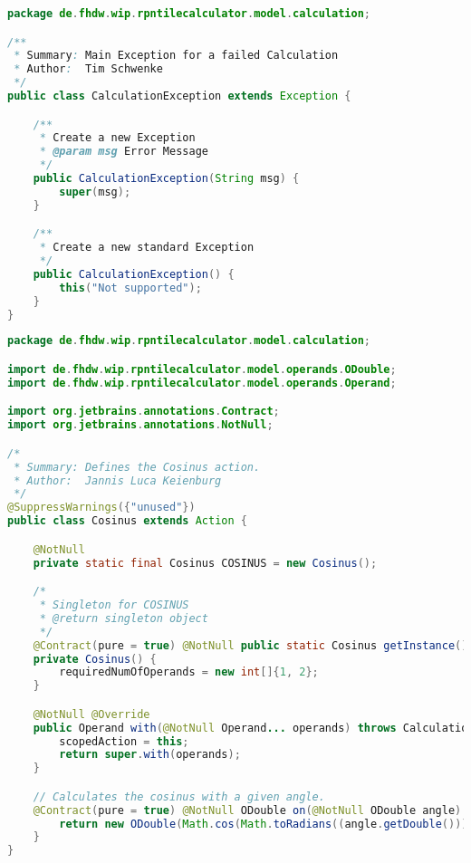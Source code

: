 \begin{lstlisting}[caption=CalculationException (Schwenke),label=list:CalculationException,language=Java]
package de.fhdw.wip.rpntilecalculator.model.calculation;

/**
 * Summary: Main Exception for a failed Calculation
 * Author:  Tim Schwenke
 */
public class CalculationException extends Exception {

    /**
     * Create a new Exception
     * @param msg Error Message
     */
    public CalculationException(String msg) {
        super(msg);
    }

    /**
     * Create a new standard Exception
     */
    public CalculationException() {
        this("Not supported");
    }
}
\end{lstlisting}    

\begin{lstlisting}[caption=Cosinus (Keienburg),label=list:Cosinus,language=Java]
package de.fhdw.wip.rpntilecalculator.model.calculation;

import de.fhdw.wip.rpntilecalculator.model.operands.ODouble;
import de.fhdw.wip.rpntilecalculator.model.operands.Operand;

import org.jetbrains.annotations.Contract;
import org.jetbrains.annotations.NotNull;

/*
 * Summary: Defines the Cosinus action.
 * Author:  Jannis Luca Keienburg
 */
@SuppressWarnings({"unused"})
public class Cosinus extends Action {

    @NotNull
    private static final Cosinus COSINUS = new Cosinus();

    /*
     * Singleton for COSINUS
     * @return singleton object
     */
    @Contract(pure = true) @NotNull public static Cosinus getInstance() { return COSINUS; }
    private Cosinus() {
        requiredNumOfOperands = new int[]{1, 2};
    }

    @NotNull @Override
    public Operand with(@NotNull Operand... operands) throws CalculationException {
        scopedAction = this;
        return super.with(operands);
    }

    // Calculates the cosinus with a given angle.
    @Contract(pure = true) @NotNull ODouble on(@NotNull ODouble angle) {
        return new ODouble(Math.cos(Math.toRadians((angle.getDouble()))));
    }
}
\end{lstlisting}    

